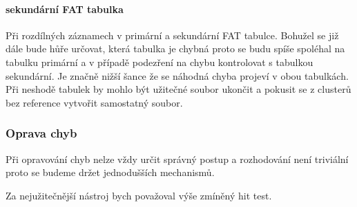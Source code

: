 \documentclass[12pt]{article}
\begin{document}
\pagebreak

\paragraph{sekundární FAT tabulka}
Při rozdílných záznamech v primární a sekundární FAT tabulce. Bohužel se již dále bude hůře určovat, která tabulka je chybná proto se budu spíše spoléhal na tabulku primární a v případě podezření na chybu kontrolovat s tabulkou sekundární. Je značně nižší šance že se náhodná chyba projeví v obou tabulkách. Při neshodě tabulek by mohlo být užitečné soubor ukončit a pokusit se z clusterů bez reference vytvořit samostatný soubor.

\subsubsection{Oprava chyb} \label{oprava}
Při opravování chyb nelze vždy určit správný postup a rozhodování není triviální proto se budeme držet jednodušších mechanismů.

Za nejužitečnější nástroj bych považoval výše zmíněný hit test.
\end{document}
